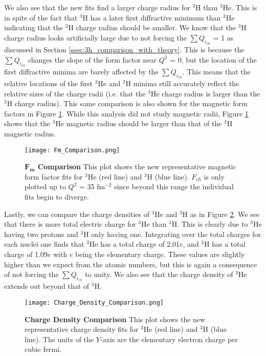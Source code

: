 We also see that the new fits find a larger charge radius for $^3$H than $^3$He. This is in spite of the fact that $^3$H has a later first diffractive minimum than $^3$He indicating that the $^3$H charge radius should be smaller. We know that the $^3$H charge radius looks artificially large due to not forcing the $\sum Q_{i_{ch}}$ = 1 as discussed in Section \ref{ssec:3h_comparison_with_theory}. This is because the $\sum Q_{i_{ch}}$ changes the slope of the form factor near $Q^2$ = 0, but the location of the first diffractive minima are barely affected by the $\sum Q_{i_{ch}}$. This means that the relative locations of the first $^3$He and $^3$H minima still accurately reflect the relative sizes of the charge radii (i.e. that the $^3$He charge radius is larger than the $^3$H charge radius). This same comparison is also shown for the magnetic form factors in Figure \ref{fig:fm_comparison}. While this analysis did not study magnetic radii, Figure \ref{fig:fm_comparison} shows that the $^3$He magnetic radius should be larger than that of the $^3$H magnetic radius.

\begin{figure}[!ht]
	\begin{center}
	\texttt{[image: Fm\_Comparison.png]}
	\end{center}
	\caption[$F_{m}$ Comparison]{
	{\bf{$\boldsymbol{F_{m}}$ Comparison}} This plot shows the new representative magnetic form factor fits for $^3$He (red line) and $^3$H (blue line). $F_{ch}$ is only plotted up to $Q^2$ = 35 fm$^{-2}$ since beyond this range the individual fits begin to diverge.}
	\label{fig:fm_comparison}
\end{figure}

Lastly, we can compare the charge densities of $^3$He and $^3$H as in Figure \ref{fig:charge_density_comparison}. We see that there is more total electric charge for $^3$He than $^3$H. This is clearly due to $^3$He having two protons and $^3$H only having one. Integrating over the total charges for each nuclei one finds that $^3$He has a total charge of 2.01$e$, and $^3$H has a total charge of 1.09$e$ with $e$ being the elementary charge. These values are slightly higher than we expect from the atomic numbers, but this is again a consequence of not forcing the $\sum Q_{i_{ch}}$ to unity. We also see that the charge density of $^3$He extends out beyond that of $^3$H. 

\begin{figure}[!ht]
	\begin{center}
	\texttt{[image: Charge\_Density\_Comparison.png]}
	\end{center}
	\caption[Charge Density Comparison]{
	{\bf{Charge Density Comparison}} This plot shows the new representative charge density fits for $^3$He (red line) and $^3$H (blue line). The units of the $Y$-axis are the elementary electron charge per cubic fermi.}
	\label{fig:charge_density_comparison}
\end{figure}

